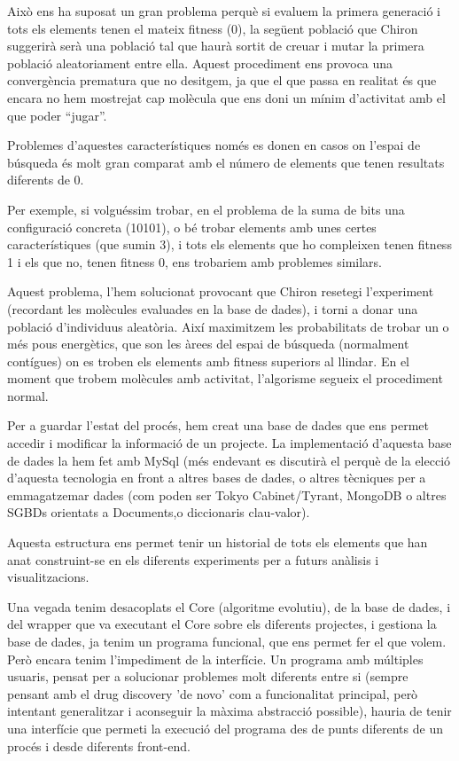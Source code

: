 \documentclass[titlepage,a4paper,12pt]{book}
\begin{document}
Això ens ha suposat un gran problema perquè si evaluem la primera generació i
tots els elements tenen el mateix fitness (0), la següent població que Chiron
suggerirà serà una població tal que haurà sortit de creuar i mutar la primera
població aleatoriament entre ella.  Aquest procediment ens provoca una
convergència prematura que no desitgem, ja que el que passa en realitat és que
encara no hem mostrejat cap molècula que ens doni un mínim d'activitat amb el
que poder ``jugar''.

Problemes d'aquestes característiques només es donen en casos on l'espai de
búsqueda és molt gran comparat amb el número de elements que tenen resultats
diferents de 0.

Per exemple, si volguéssim trobar, en el problema de la suma de bits una
configuració concreta (10101), o bé trobar elements amb unes certes
característiques (que sumin 3), i tots els elements que ho compleixen tenen
fitness 1 i els que no, tenen fitness 0, ens trobariem amb problemes similars.

Aquest problema, l'hem solucionat provocant que Chiron resetegi l'experiment
(recordant les molècules evaluades en la base de dades), i torni a donar una
població d'individuus aleatòria.  Així maximitzem les probabilitats de trobar un
o més pous energètics, que son les àrees del espai de búsqueda (normalment
contígues) on es troben els elements amb fitness superiors al llindar.  En el
moment que trobem molècules amb activitat, l'algorisme segueix el procediment
normal.

Per a guardar l'estat del procés, hem creat una base de dades que ens permet
accedir i modificar la informació de un projecte.  La implementació d'aquesta
base de dades la hem fet amb MySql (més endevant es discutirà el perquè de la
elecció d'aquesta tecnologia en front a altres bases de dades, o altres
tècniques per a emmagatzemar dades (com poden ser Tokyo Cabinet/Tyrant, MongoDB
o altres SGBDs orientats a Documents,o diccionaris clau-valor).

\lstset{language=sql, tabsize=2}
\lstset{commentstyle=\textit}


Aquesta estructura ens permet tenir un historial de tots els elements que han
anat construint-se en els diferents experiments per a futurs anàlisis i
visualitzacions.

Una vegada tenim desacoplats el Core (algoritme evolutiu), de la base de dades,
i del wrapper que va executant el Core sobre els diferents projectes, i gestiona
la base de dades, ja tenim un programa funcional, que ens permet fer el que
volem.  Però encara tenim l'impediment de la interfície.  Un programa amb
múltiples usuaris, pensat per a solucionar problemes molt diferents entre si
(sempre pensant amb el drug discovery 'de novo' com a funcionalitat principal,
 però intentant generalitzar i aconseguir la màxima abstracció possible), hauria
de tenir una interfície que permeti la execució del programa des de punts
diferents de un procés i desde diferents front-end.  
\end{document}
